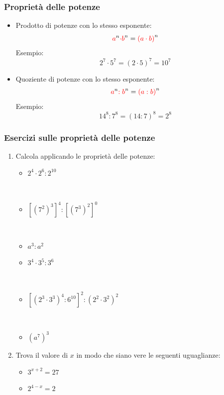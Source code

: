 \documentclass[handout]{beamer}
\theoremstyle{plain}
\begin{document}
\begin{frame}
\frametitle{Proprietà delle potenze}
\begin{itemize}
  \item Prodotto di potenze con lo stesso esponente:
  \[ {\textcolor{red}{a}}^n {\textcolor{red}{\cdot b}}^n = {\textcolor{red}{(a \cdot b)}}^n \]
  Esempio:
  \[2^7 \cdot 5^7 = (2 \cdot 5)^{7} = 10^{7} \]\pause
  \item Quoziente di potenze con lo stesso esponente:
  \[ {\textcolor{red}{a}}^n {\textcolor{red}{: b}}^n = {\textcolor{red}{(a : b)}}^n \]
  Esempio:
  \[14^8 : 7^8 = (14 : 7)^{8} = 2^{8} \]
\end{itemize}
\end{frame}


\begin{frame}
\frametitle{Esercizi sulle proprietà delle potenze}
\begin{enumerate}
  \item Calcola applicando le proprietà delle potenze:
  \begin{multicols}{2}
    \begin{itemize}
        \item $ 2^4 \cdot 2^6 : 2^{10} $
        
        ~

        \item $ \left[ (7^2)^3\right]^4 : \left[(7^3)^2\right]^0 $
        
        
        ~

        \item $ a^3 : a^2 $
        \item $ 3^4 \cdot 3^5 : 3^6 $
        
        
        ~

        \item $ \left[ (2^3 \cdot 3^3)^4 : 6^{10} \right]^2 : (2^2 \cdot 3^2)^2 $
        
        
        ~

        \item $ (a^7)^3 $
    \end{itemize}
  \end{multicols}
  \item Trova il valore di $ x $ in modo che siano vere le seguenti uguaglianze:
  \begin{multicols}{2}
    \begin{itemize}
        \item $ 3^{x+2} = 27 $
        \item $ 2^{4-x} = 2 $
    \end{itemize}
  \end{multicols}
\end{enumerate}
\end{frame}
\end{document}
